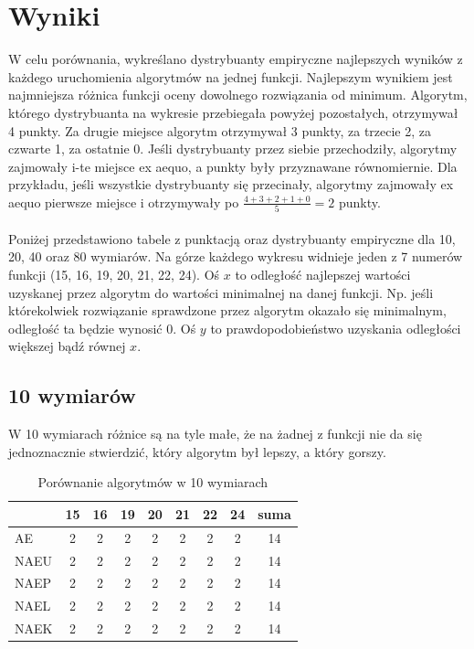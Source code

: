 \documentclass[12pt, a4paper]{article}
\begin{document}
\section{Wyniki}

W celu porównania, wykreślano dystrybuanty empiryczne najlepszych wyników z każdego uruchomienia 
algorytmów na jednej funkcji. Najlepszym wynikiem jest najmniejsza różnica funkcji oceny dowolnego rozwiązania od minimum.
Algorytm, którego dystrybuanta na wykresie przebiegała powyżej pozostałych, otrzymywał 4 punkty. 
Za drugie miejsce algorytm otrzymywał 3 punkty, za trzecie 2, za czwarte 1, za ostatnie 0. 
Jeśli dystrybuanty przez siebie przechodziły, algorytmy zajmowały i-te miejsce ex aequo, a punkty były przyznawane równomiernie.
Dla przykładu, jeśli wszystkie dystrybuanty się przecinały, algorytmy zajmowały ex aequo pierwsze miejsce i otrzymywały po
$\frac{4+3+2+1+0}{5}=2$ punkty. \\
\\
Poniżej przedstawiono tabele z punktacją oraz dystrybuanty empiryczne dla 10, 20, 40 oraz 80 wymiarów.
Na górze każdego wykresu widnieje jeden z 7 numerów funkcji (15, 16, 19, 20, 21, 22, 24).
Oś $x$ to odległość najlepszej wartości uzyskanej przez algorytm do
wartości minimalnej na danej funkcji. Np. jeśli którekolwiek rozwiązanie sprawdzone przez 
algorytm okazało się minimalnym, odległość ta będzie wynosić 0. Oś $y$ to prawdopodobieństwo
uzyskania odległości większej bądź równej $x$.

\subsection{10 wymiarów}

W 10 wymiarach różnice są na tyle małe, że na żadnej z funkcji nie da się jednoznacznie stwierdzić,
który algorytm był lepszy, a który gorszy.

\begin{table}[H]
\centering
\begin{tabular}{ l | c | c | c | c | c | c | c | c}
         & 15 & 16 & 19 & 20 & 21 & 22 & 24 & suma \\ \hline
AE       & 2  & 2  & 2  & 2  & 2  & 2  & 2  & 14   \\ 
NAEU     & 2  & 2  & 2  & 2  & 2  & 2  & 2  & 14   \\ 
NAEP     & 2  & 2  & 2  & 2  & 2  & 2  & 2  & 14   \\ 
NAEL     & 2  & 2  & 2  & 2  & 2  & 2  & 2  & 14   \\
NAEK     & 2  & 2  & 2  & 2  & 2  & 2  & 2  & 14   \\ 
\end{tabular}
\caption{Porównanie algorytmów w 10 wymiarach}
\label{table:total}
\end{table}
\end{document}
